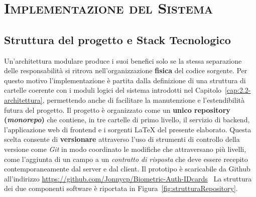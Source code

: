 \chapter{\scshape Implementazione del Sistema}\label{cap:3-implementazione}

\section{Struttura del progetto e Stack Tecnologico}
Un'architettura modulare produce i suoi benefici solo se la stessa separazione delle responsabilità si ritrova nell'organizzazione \textbf{fisica} del codice sorgente.
Per questo motivo l'implementazione è partita dalla definizione di una struttura di cartelle coerente con i moduli logici del sistema introdotti nel Capitolo~\ref{cap:2.2-architettura}, permettendo anche di facilitare la manutenzione e l'estendibilità futura del progetto.
Il progetto è organizzato come un \textbf{unico repository (\textit{monorepo})} che contiene, in tre cartelle di primo livello, il servizio di backend, l'applicazione web di frontend e i sorgenti \LaTeX{} del presente elaborato.
Questa scelta consente di \textbf{versionare} attraverso l'uso di strumenti di controllo della versione come \textit{Git} in modo coordinato le modifiche che attraversano più livelli, come l'aggiunta di un campo a un \textit{contratto di risposta} che deve essere recepito contemporaneamente dal server e dal client.
Il prototipo è scaricabile da Github all'indirizzo \url{https://github.com/Jonnycp/Biometric-Auth-IDcards}~\cite{JonnycpBiometricAuthIDcardsTesi}
La struttura dei due componenti software è riportata in Figura~\ref{fig:strutturaRepository}.

